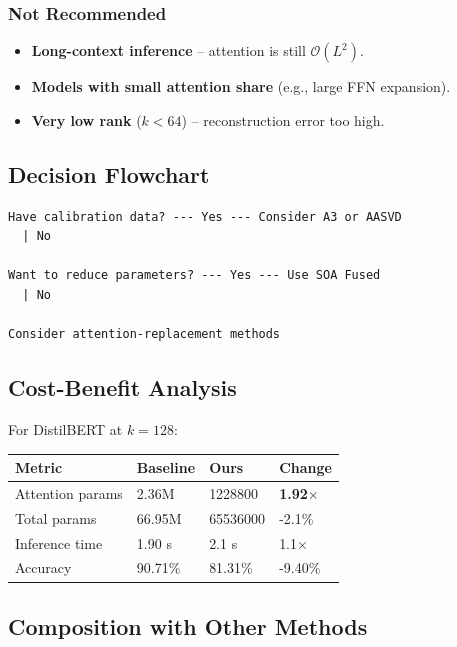 \subsubsection{Not Recommended}
\begin{itemize}
\item \textbf{Long-context inference} -- attention is still $\mathcal{O}(L^2)$.
\item \textbf{Models with small attention share} (e.g., large FFN expansion).
\item \textbf{Very low rank} ($k < 64$) -- reconstruction error too high.

\end{itemize}
\subsection{Decision Flowchart}

\begin{lstlisting}
Have calibration data? --- Yes --- Consider A3 or AASVD
  | No
   
Want to reduce parameters? --- Yes --- Use SOA Fused
  | No
   
Consider attention-replacement methods
\end{lstlisting}

\subsection{Cost-Benefit Analysis}

For DistilBERT at $k = 128$:

\begin{table}[H]
\centering
\small
\begin{tabular}{llll}
\toprule
\textbf{Metric} & \textbf{Baseline} & \textbf{Ours} & \textbf{Change} \\
\midrule
Attention params & 2.36M & 1228800 & \textbf{1.92$\times$} \\
Total params & 66.95M & 65536000 & -2.1\% \\
Inference time & 1.90 s & 2.1 s & 1.1$\times$ \\
Accuracy & 90.71\% & 81.31\% & -9.40\% \\
\bottomrule
\end{tabular}
\end{table}

\subsection{Composition with Other Methods}

